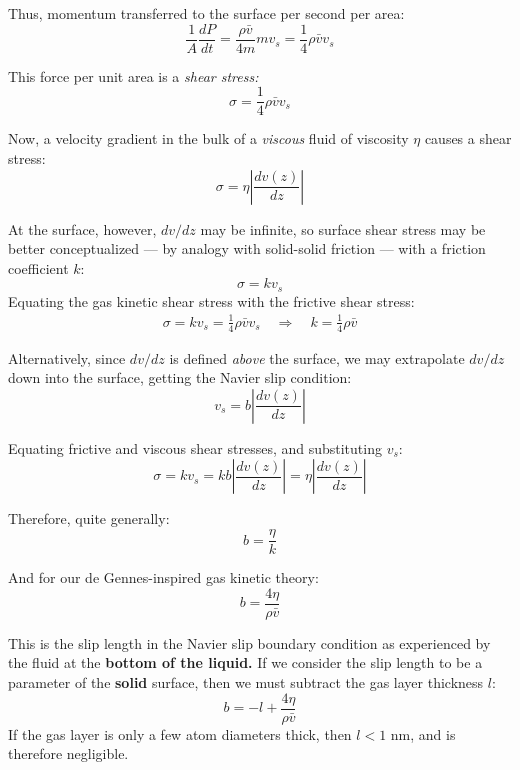\documentclass[12pt, a4paper, twoside, openright]{book}
\begin{document}
Thus, momentum transferred to the surface per second per area:
\begin{equation}
\frac{1}{A} \frac{dP}{dt} = \frac{\rho \bar{v}}{4 m} m v_{s} 
= \frac{1}{4} \rho \bar{v} v_{s}
\end{equation}

This force per unit area is a \emph{shear stress:}
\begin{equation}
 \sigma = \frac{1}{4} \rho \bar{v} v_{s}
\end{equation}

Now, a velocity gradient in the bulk of a \emph{viscous} fluid of viscosity $\eta$ causes a shear stress:
\begin{equation}
\sigma = \eta \left| \frac{dv(z)}{dz} \right|
\end{equation}

At the surface, however, $dv/dz$ may be infinite, so surface shear stress may be better conceptualized --- by analogy with solid-solid friction --- with a friction coefficient $k$:
\begin{equation}
 \sigma = k v_{s}
\end{equation}
Equating the gas kinetic shear stress with the frictive shear stress:
\begin{gather}
\sigma = k v_{s} = \frac{1}{4} \rho \bar{v} v_{s} \quad \Rightarrow \quad
 k = \frac{1}{4} \rho \bar{v}
\end{gather}

Alternatively, since $dv/dz$ is defined \emph{above} the surface, we may extrapolate $dv/dz$ down into the surface, getting the Navier slip condition:
\begin{equation}
v_{s} = b \left| \frac{dv(z)}{dz} \right|
\end{equation}

Equating frictive and viscous shear stresses, and substituting $v_{s}$:
\begin{equation}
\sigma = k v_{s} = k b \left| \frac{dv(z)}{dz} \right| = \eta \left| \frac{dv(z)}{dz} \right|
\end{equation}

Therefore, quite generally:
\begin{equation}
 b = \frac{\eta}{k}
\end{equation}

And for our de Gennes-inspired gas kinetic theory:
\begin{equation}
b = \frac{4 \eta}{\rho \bar{v}}
\end{equation}

This is the slip length in the Navier slip boundary condition as experienced by the fluid at the \textbf{bottom of the liquid.}  If we consider the slip length to be a parameter of the \textbf{solid} surface, then we must subtract the gas layer thickness $l$:
\begin{equation}
b = -l + \frac{4 \eta}{\rho \bar{v}}
\end{equation}
If the gas layer is only a few atom diameters thick, then $l < 1$ nm, and is therefore negligible.
\end{document}
